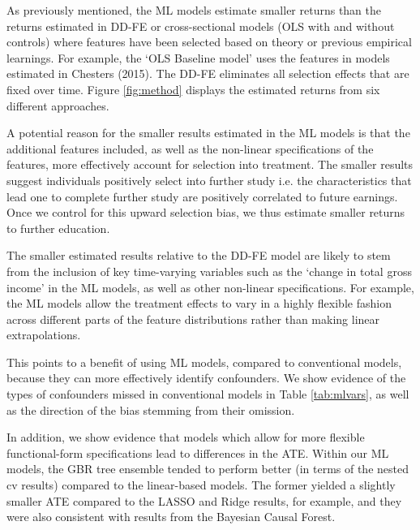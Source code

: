 \documentclass[12pt, a4paper]{article}
\begin{document}
As previously mentioned, the ML models estimate smaller returns than the returns estimated in DD-FE or cross-sectional models (OLS with and without controls) where features have been selected based on theory or previous empirical learnings. For example, the `OLS Baseline model' uses the features in models estimated in Chesters (2015). The DD-FE eliminates all selection effects that are fixed over time. Figure \ref{fig:method} displays the estimated returns from six different approaches.

A potential reason for the smaller results estimated in the ML models is that the additional features included, as well as the non-linear specifications of the features, more effectively account for selection into treatment. The smaller results suggest individuals positively select into further study i.e. the characteristics that lead one to complete further study are positively correlated to future earnings. Once we control for this upward selection bias, we thus estimate smaller returns to further education.

The smaller estimated results relative to the DD-FE model are likely to stem from the inclusion of key time-varying variables such as the `change in total gross income' in the ML models, as well as other non-linear specifications. For example, the ML models allow the treatment effects to vary in a highly flexible fashion across different parts of the feature distributions rather than making linear extrapolations.

This points to a benefit of using ML models, compared to conventional models, because they can more effectively identify confounders. We show evidence of the types of confounders missed in conventional models in Table \ref{tab:mlvars}, as well as the direction of the bias stemming from their omission. 

In addition, we show evidence that models which allow for more flexible functional-form specifications lead to differences in the ATE. Within our ML models, the GBR tree ensemble tended to perform better (in terms of the nested cv results) compared to the linear-based models. The former yielded a slightly smaller ATE compared to the LASSO and Ridge results, for example, and they were also consistent with results from the Bayesian Causal Forest.
\end{document}
